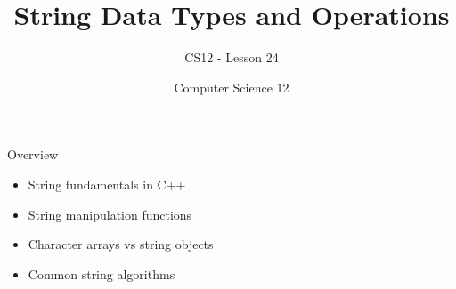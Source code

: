 \documentclass[10pt]{beamer}
\title{String Data Types and Operations}
\subtitle{CS12 - Lesson 24}
\author{Computer Science 12}
\date{}
\begin{document}
\begin{frame}
    \titlepage
\end{frame}

\begin{frame}{Overview}
    \begin{itemize}
        \item String fundamentals in C++
        \item String manipulation functions
        \item Character arrays vs string objects
        \item Common string algorithms
    \end{itemize}
\end{frame}

\end{document}
